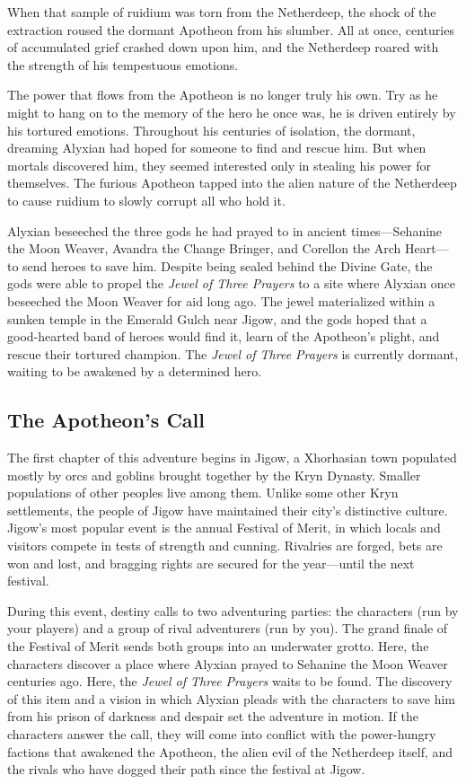 \documentclass[a4paper, 11pt, bg=full, twocolumn, nooutline]{dndbook}
\begin{document}
When that sample of ruidium was torn from the Netherdeep, the shock of the extraction roused the dormant Apotheon from his slumber. All at once, centuries of accumulated grief crashed down upon him, and the Netherdeep roared with the strength of his tempestuous emotions.

The power that flows from the Apotheon is no longer truly his own. Try as he might to hang on to the memory of the hero he once was, he is driven entirely by his tortured emotions. Throughout his centuries of isolation, the dormant, dreaming Alyxian had hoped for someone to find and rescue him. But when mortals discovered him, they seemed interested only in stealing his power for themselves. The furious Apotheon tapped into the alien nature of the Netherdeep to cause ruidium to slowly corrupt all who hold it.

Alyxian beseeched the three gods he had prayed to in ancient times---Sehanine the Moon Weaver, Avandra the Change Bringer, and Corellon the Arch Heart---to send heroes to save him. Despite being sealed behind the Divine Gate, the gods were able to propel the \textit{Jewel of Three Prayers} to a site where Alyxian once beseeched the Moon Weaver for aid long ago. The jewel materialized within a sunken temple in the Emerald Gulch near Jigow, and the gods hoped that a good-hearted band of heroes would find it, learn of the Apotheon's plight, and rescue their tortured champion. The \textit{Jewel of Three Prayers} is currently dormant, waiting to be awakened by a determined hero.

\subsection{The Apotheon's Call}

The first chapter of this adventure begins in Jigow, a Xhorhasian town populated mostly by orcs and goblins brought together by the Kryn Dynasty. Smaller populations of other peoples live among them. Unlike some other Kryn settlements, the people of Jigow have maintained their city's distinctive culture. Jigow's most popular event is the annual Festival of Merit, in which locals and visitors compete in tests of strength and cunning. Rivalries are forged, bets are won and lost, and bragging rights are secured for the year---until the next festival.

During this event, destiny calls to two adventuring parties: the characters (run by your players) and a group of rival adventurers (run by you). The grand finale of the Festival of Merit sends both groups into an underwater grotto. Here, the characters discover a place where Alyxian prayed to Sehanine the Moon Weaver centuries ago. Here, the \textit{Jewel of Three Prayers} waits to be found. The discovery of this item and a vision in which Alyxian pleads with the characters to save him from his prison of darkness and despair set the adventure in motion. If the characters answer the call, they will come into conflict with the power-hungry factions that awakened the Apotheon, the alien evil of the Netherdeep itself, and the rivals who have dogged their path since the festival at Jigow.
\end{document}
